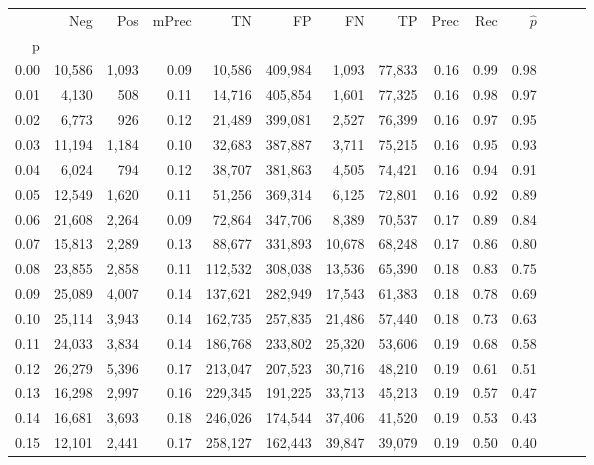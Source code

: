 \begin{tabular}{rrrrrrrrrrrrrr}
\toprule
{} &     Neg &    Pos & mPrec &       TN &       FP &      FN &      TP &  Prec &   Rec & $\hat{p}$ \\
p    &         &        &       &          &          &         &         &       &       &           \\
\midrule
0.00 &  10,586 &  1,093 &  0.09 &   10,586 &  409,984 &   1,093 &  77,833 &  0.16 &  0.99 &      0.98 \\
0.01 &   4,130 &    508 &  0.11 &   14,716 &  405,854 &   1,601 &  77,325 &  0.16 &  0.98 &      0.97 \\
0.02 &   6,773 &    926 &  0.12 &   21,489 &  399,081 &   2,527 &  76,399 &  0.16 &  0.97 &      0.95 \\
0.03 &  11,194 &  1,184 &  0.10 &   32,683 &  387,887 &   3,711 &  75,215 &  0.16 &  0.95 &      0.93 \\
0.04 &   6,024 &    794 &  0.12 &   38,707 &  381,863 &   4,505 &  74,421 &  0.16 &  0.94 &      0.91 \\
0.05 &  12,549 &  1,620 &  0.11 &   51,256 &  369,314 &   6,125 &  72,801 &  0.16 &  0.92 &      0.89 \\
0.06 &  21,608 &  2,264 &  0.09 &   72,864 &  347,706 &   8,389 &  70,537 &  0.17 &  0.89 &      0.84 \\
0.07 &  15,813 &  2,289 &  0.13 &   88,677 &  331,893 &  10,678 &  68,248 &  0.17 &  0.86 &      0.80 \\
0.08 &  23,855 &  2,858 &  0.11 &  112,532 &  308,038 &  13,536 &  65,390 &  0.18 &  0.83 &      0.75 \\
0.09 &  25,089 &  4,007 &  0.14 &  137,621 &  282,949 &  17,543 &  61,383 &  0.18 &  0.78 &      0.69 \\
0.10 &  25,114 &  3,943 &  0.14 &  162,735 &  257,835 &  21,486 &  57,440 &  0.18 &  0.73 &      0.63 \\
0.11 &  24,033 &  3,834 &  0.14 &  186,768 &  233,802 &  25,320 &  53,606 &  0.19 &  0.68 &      0.58 \\
0.12 &  26,279 &  5,396 &  0.17 &  213,047 &  207,523 &  30,716 &  48,210 &  0.19 &  0.61 &      0.51 \\
0.13 &  16,298 &  2,997 &  0.16 &  229,345 &  191,225 &  33,713 &  45,213 &  0.19 &  0.57 &      0.47 \\
0.14 &  16,681 &  3,693 &  0.18 &  246,026 &  174,544 &  37,406 &  41,520 &  0.19 &  0.53 &      0.43 \\
0.15 &  12,101 &  2,441 &  0.17 &  258,127 &  162,443 &  39,847 &  39,079 &  0.19 &  0.50 &      0.40 \\

\end{tabular}
